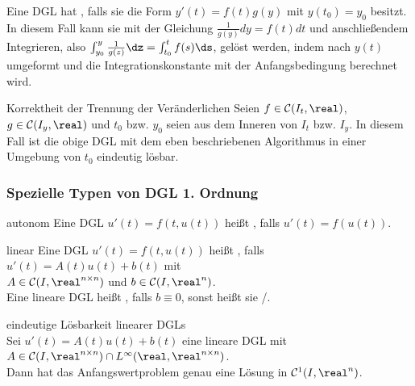 \begin{Bem}
    Eine DGL hat , falls sie die Form
    $y'(t) = f(t) g(y)$ mit $y(t_0) = y_0$ besitzt.
    In diesem Fall kann sie mit der Gleichung
    $\frac{1}{g(y)} dy = f(t) dt$ und anschließendem Integrieren, also
    $\int_{y_0}^y \frac{1}{g(z)}\dz = \int_{t_0}^t f(s)\ds$, gelöst werden,
    indem nach $y(t)$ umgeformt und die Integrationskonstante mit der
    Anfangsbedingung berechnet wird.
\end{Bem}

\begin{Satz}{Korrektheit der Trennung der Veränderlichen}
    Seien $f \in \C(I_t, \real)$, $g \in \C(I_y, \real)$ und
    $t_0$ bzw. $y_0$ seien aus dem Inneren von $I_t$ bzw. $I_y$.
    In diesem Fall ist die obige DGL mit dem eben beschriebenen Algorithmus
    in einer Umgebung von $t_0$ eindeutig lösbar.
\end{Satz}

\pagebreak

\subsubsection{%
    Spezielle Typen von DGL 1. Ordnung%
}

\begin{Def}{autonom}
    Eine DGL $u'(t) = f(t, u(t))$ heißt ,
    falls $u'(t) = f(u(t))$.
\end{Def}

\begin{Def}{linear}
    Eine DGL $u'(t) = f(t, u(t))$ heißt ,
    falls $u'(t) = A(t) u(t) + b(t)$ mit\\
    $A \in \C(I, \real^{n \times n})$ und $b \in \C(I, \real^n)$.\\
    Eine lineare DGL heißt , falls $b \equiv 0$,
    sonst heißt sie /.
\end{Def}

\begin{Satz}{eindeutige Lösbarkeit linearer DGLs}\\
    Sei $u'(t) = A(t)u(t) + b(t)$ eine lineare DGL mit
    $A \in \C(I, \real^{n \times n}) \cap
    L^\infty(\real, \real^{n \times n})$.\\
    Dann hat das Anfangswertproblem genau eine Lösung in $\C^1(I, \real^n)$.
\end{Satz}

